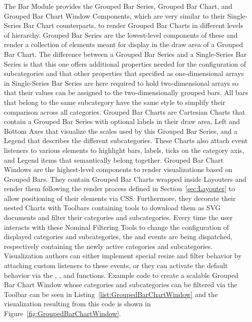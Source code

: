 The Bar Module provides the Grouped Bar Series, Grouped Bar Chart, and Grouped Bar Chart Window Components, which are very similar to their Single-Series Bar Chart counterparts, to render Grouped Bar Charts in different levels of hierarchy.
Grouped Bar Series are the lowest-level components of these and render a collection of  elements meant for display in the draw area of a Grouped Bar Chart.
The difference between a Grouped Bar Series and a Single-Series Bar Series is that this one offers additional properties needed for the configuration of subcategories and that other properties that specified as one-dimensional arrays in Single-Series Bar Series are here required to hold two-dimensional arrays so that their values can be assigned to the two-dimensionally grouped bars.
All bars that belong to the same subcategory have the same style to simplify their comparison across all categories.
Grouped Bar Charts are Cartesian Charts that contain a Grouped Bar Series with optional labels in their draw area, Left and Bottom Axes that visualize the scales used by this Grouped Bar Series, and a Legend that describes the different subcategories.
These Charts also attach event listeners to various elements to highlight bars, labels, ticks on the category axis, and Legend items that semantically belong together.
Grouped Bar Chart Windows are the highest-level components to render visualizations based on Grouped Bars.
They contain Grouped Bar Charts wrapped inside Layouters and render them following the render process defined in Section~\ref{sec:Layouter} to allow positioning of their elements via CSS.
Furthermore, they decorate their nested Charts with Toolbars containing tools to download them as SVG documents and filter their categories and subcategories.
Every time the user interacts with these Nominal Filtering Tools to change the configuration of displayed categories and subcategories, the  and  events are being dispatched, respectively containing the newly active categories and subcategories.
Visualization authors can either implement special resize and filter behavior by attaching custom listeners to these events, or they can activate the default behavior via the , , and  functions.
Example code to create a scalable Grouped Bar Chart Window whose categories and subcategories can be filtered via the Toolbar can be seen in Listing~\ref{list:GroupedBarChartWindow} and the visualization resulting from this code is shown in Figure~\ref{fig:GroupedBarChartWindow}.


